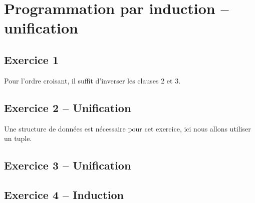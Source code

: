 \documentclass[12pt,a4paper,openany]{book}
\begin{document}
	\thispagestyle{empty} %
	\titleBC 
	\setcounter{tocdepth}{2}
	\setcounter{secnumdepth}{3}
	\tableofcontents
	\chapter{Programmation par induction -- unification}
	\section{Exercice 1}
	

	Pour l'ordre croisant, il suffit d'inverser les clauses 2 et 3.
	

	\section{Exercice 2 -- Unification}
	Une structure de données est nécessaire pour cet exercice,
	ici nous allons utiliser un tuple.
	
	
	\section{Exercice 3 -- Unification}
	

	\section{Exercice 4 -- Induction}
	

	

	\appendix
	\lstlistoflistings
		
\end{document}
